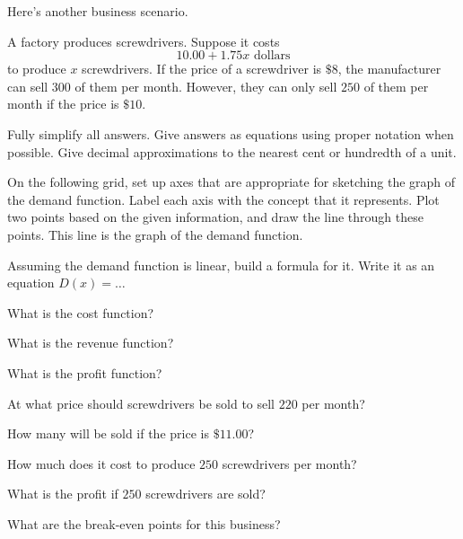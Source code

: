 Here's another business scenario.

A factory produces screwdrivers. Suppose it costs
\begin{equation*}
 10.00 + 1.75 x \text{ dollars}
\end{equation*}
to produce $x$ screwdrivers.
If the price of a screwdriver is $\$8$, the manufacturer can sell $300$ of them per month.
However, they can only sell $250$ of them per month if the price is $\$10$.

Fully simplify all answers.
Give answers as equations using proper notation when possible.
Give decimal approximations to the nearest cent or hundredth of a unit.

\begin{ProblemSet}
 \begin{Problem}[pencil space=0.5in]
  On the following grid, set up axes that are appropriate for sketching the graph of the demand function.
  Label each axis with the concept that it represents.
  Plot two points based on the given information, and draw the line through these points.
  This line is the graph of the demand function.
  \vspace{0.5in}

  \GraphingGridSmall

 \end{Problem}

 \begin{Problem}
  Assuming the demand function is linear, build a formula for it.
  Write it as an equation $D(x) = \dots$
 \end{Problem}

 \begin{Problem}
  What is the cost function?
 \end{Problem}

 \begin{Problem}
  What is the revenue function?
 \end{Problem}

 \begin{Problem}
  What is the profit function?
 \end{Problem}

 \begin{Problem}
  At what price should screwdrivers be sold to sell $220$ per month?
 \end{Problem}

 \begin{Problem}
  How many will be sold if the price is $\$11.00$?
 \end{Problem}

 \begin{Problem}
  How much does it cost to produce $250$ screwdrivers per month?
 \end{Problem}

 \begin{Problem}
  What is the profit if $250$ screwdrivers are sold?
 \end{Problem}

 \begin{Problem}
  What are the break-even points for this business?
 \end{Problem}

\end{ProblemSet}

